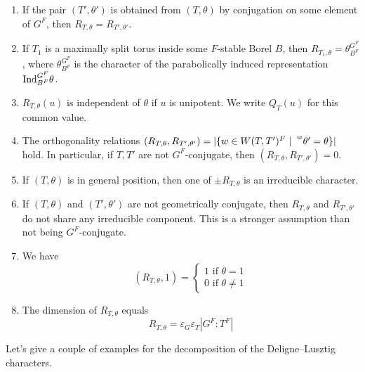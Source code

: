 \begin{enumerate}
    \item If the pair $(T',\theta')$ is obtained from $(T,\theta)$ by conjugation on some element of $G^F$, then $R_{T,\theta}=R_{T',\theta'}$.
    \item If $T_1$ is a maximally split torus inside some $F$-stable Borel $B$, then $R_{T_1,\theta}=\theta_{B^F}^{G^F}$, where $\theta_{B^F}^{G^F}$ is the character of the parabolically induced representation $\mathrm{Ind}_{B^F}^{G^F}\theta$.
    \item $R_{T,\theta}(u)$ is independent of $\theta$ if $u$ is unipotent. We write $Q_T(u)$ for this common value.
    \item The orthogonality relations $(R_{T,\theta},R_{T',\theta'})=|\{w\in W(T,T')^F\ |\ \prescript{w}{}{\theta'}=\theta\}|$ hold. In particular, if $T,T'$ are not $G^F$-conjugate, then $(R_{T,\theta},R_{T',\theta'})=0$.
    \item If $(T,\theta)$ is in general position, then one of $\pm R_{T,\theta}$ is an irreducible character.
    \item If $(T,\theta)$ and $(T',\theta')$ are not geometrically conjugate, then $R_{T,\theta}$ and $R_{T',\theta'}$ do not share any irreducible component. This is a stronger assumption than not being $G^F$-conjugate.
    \item We have
    \begin{equation*}
        (R_{T,\theta},1)=\begin{cases}
            1 \text{ if } \theta=1\\
            0 \text{ if } \theta\neq1
        \end{cases}
    \end{equation*}
    \item The dimension of $R_{T,\theta}$ equals
    $$R_{T,\theta}=\varepsilon_G\varepsilon_T|G^F:T^F|$$
\end{enumerate}

Let's give a couple of examples for the decomposition of the Deligne--Lusztig characters.


